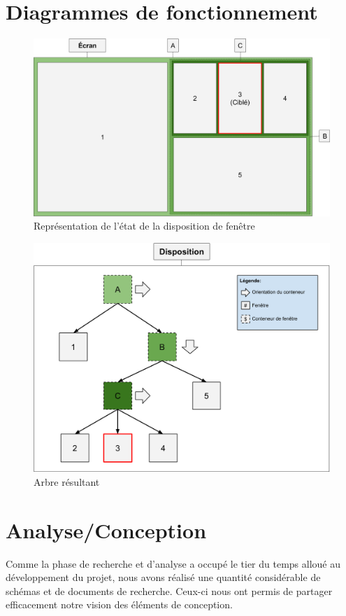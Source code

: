 \documentclass[titlepage]{article}
\begin{document}
\section{Diagrammes de fonctionnement}
\begin{figure}[H]
	\centering
	\includegraphics[width=\textwidth]{diagramme_du_fonctionnement.png}
	\caption{Représentation de l'état de la disposition de fenêtre}
\end{figure}
\begin{figure}[H]
	\centering
	\includegraphics[width=\textwidth]{diagramme_du_fonctionnement_arbre.png}
	\caption{Arbre résultant}
\end{figure}

\section{Analyse/Conception}
\par
Comme la phase de recherche et d'analyse a occupé le tier du temps alloué au développement du projet, nous avons réalisé une quantité considérable de schémas et de documents de recherche. Ceux-ci nous ont permis de partager efficacement notre vision des éléments de conception.
\bigskip
\end{document}
